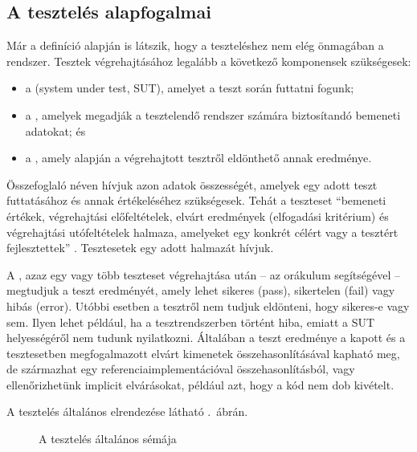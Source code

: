 \subsection{A tesztelés alapfogalmai}
Már a definíció alapján is látszik, hogy a teszteléshez nem elég önmagában a rendszer. Tesztek végrehajtásához legalább a következő komponensek szükségesek: 
\begin{itemize}
\item a  (system under test, SUT), amelyet a teszt során futtatni fogunk;
\item a , amelyek megadják a tesztelendő rendszer számára biztosítandó bemeneti adatokat; és
\item a , amely alapján a végrehajtott tesztről eldönthető annak eredménye.
\end{itemize}

Összefoglaló néven  hívjuk azon adatok összességét, amelyek egy adott teszt futtatásához és annak értékeléséhez szükségesek. Tehát a teszteset ``bemeneti értékek, végrehajtási előfeltételek, elvárt eredmények (elfogadási kritérium) és végrehajtási utófeltételek halmaza, amelyeket egy konkrét célért vagy a tesztért fejlesztettek'' \cite{HTB-glossary,IEEE-24765}. Tesztesetek egy adott halmazát  hívjuk.

A , azaz egy vagy több teszteset végrehajtása után \cite{IEEE-24765} -- az orákulum segítségével -- megtudjuk a teszt eredményét, amely lehet sikeres (pass), sikertelen (fail) vagy hibás (error). Utóbbi esetben a tesztről nem tudjuk eldönteni, hogy sikeres-e vagy sem. Ilyen lehet például, ha a tesztrendszerben történt hiba, emiatt a SUT helyességéről nem tudunk nyilatkozni. 
Általában a teszt eredménye a kapott és a tesztesetben megfogalmazott elvárt kimenetek összehasonlításával kapható meg, de származhat egy referenciaimplementációval összehasonlításból, vagy ellenőrizhetünk implicit elvárásokat, például azt, hogy a kód nem dob kivételt.

A tesztelés általános elrendezése látható .~ábrán.

\begin{figure}[h]
	\centering
	
	
	\caption{A tesztelés általános sémája}
	\label{fig:teszteles-elrendezes-orakulum}
\end{figure}

